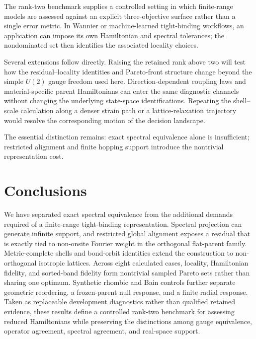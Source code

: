 \documentclass[11pt]{article}
\begin{document}
The rank-two benchmark supplies a controlled setting in which finite-range models are
assessed against an explicit three-objective surface rather than a single error metric.
In Wannier or machine-learned tight-binding workflows, an application can impose its own
Hamiltonian and spectral tolerances; the nondominated set then identifies the associated
locality choices.

Several extensions follow directly. Raising the retained rank above two will test how
the residual--locality identities and Pareto-front structure change beyond the simple
$U(2)$ gauge freedom used here. Direction-dependent coupling laws and material-specific
parent Hamiltonians can enter the same diagnostic channels without changing the
underlying state-space identifications. Repeating the shell--scale calculation along a
denser strain path or a lattice-relaxation trajectory would resolve the corresponding
motion of the decision landscape.

The essential distinction remains: exact spectral equivalence alone is insufficient;
restricted alignment and finite hopping support introduce the nontrivial representation
cost.

\section{Conclusions}

We have separated exact spectral equivalence from the additional demands required of a
finite-range tight-binding representation. Spectral projection can generate infinite
support, and restricted global alignment exposes a residual that is exactly tied to
non-onsite Fourier weight in the orthogonal flat-parent family. Metric-complete shells
and bond-orbit identities extend the construction to non-orthogonal isotropic lattices.
Across eight calculated cases, locality, Hamiltonian fidelity, and sorted-band fidelity
form nontrivial sampled Pareto sets rather than sharing one optimum. Synthetic rhombic
and Bain controls further separate geometric reordering, a frozen-parent null response,
and a finite radial response. Taken as replaceable development diagnostics rather than
qualified retained evidence, these results define a controlled rank-two benchmark for
assessing reduced Hamiltonians while preserving the distinctions among gauge
equivalence, operator agreement, spectral agreement, and real-space support.

\clearpage
\appendix




\end{document}
